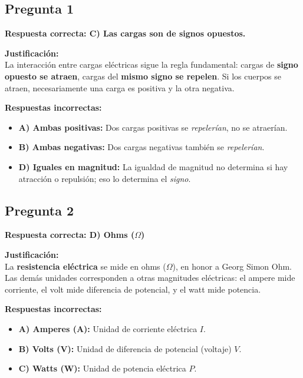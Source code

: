 \begin{respuestabox}
\subsection*{Pregunta 1}
\textcolor{verdecorrecto}{\textbf{Respuesta correcta: C) Las cargas son de signos opuestos.}}

\textbf{Justificación:}\\
La interacción entre cargas eléctricas sigue la regla fundamental: cargas de \textbf{signo opuesto se atraen}, cargas del \textbf{mismo signo se repelen}. Si los cuerpos se atraen, necesariamente una carga es positiva y la otra negativa.

\textbf{Respuestas incorrectas:}
\begin{itemize}
    \item \textbf{A) Ambas positivas:} Dos cargas positivas se \textit{repelerían}, no se atraerían.
    \item \textbf{B) Ambas negativas:} Dos cargas negativas también se \textit{repelerían}.
    \item \textbf{D) Iguales en magnitud:} La igualdad de magnitud no determina si hay atracción o repulsión; eso lo determina el \textit{signo}.
\end{itemize}
\end{respuestabox}

\begin{respuestabox}
\subsection*{Pregunta 2}
\textcolor{verdecorrecto}{\textbf{Respuesta correcta: D) Ohms ($\Omega$)}}

\textbf{Justificación:}\\
La \textbf{resistencia eléctrica} se mide en ohms ($\Omega$), en honor a Georg Simon Ohm. Las demás unidades corresponden a otras magnitudes eléctricas: el ampere mide corriente, el volt mide diferencia de potencial, y el watt mide potencia.

\textbf{Respuestas incorrectas:}
\begin{itemize}
    \item \textbf{A) Amperes (A):} Unidad de corriente eléctrica $I$.
    \item \textbf{B) Volts (V):} Unidad de diferencia de potencial (voltaje) $V$.
    \item \textbf{C) Watts (W):} Unidad de potencia eléctrica $P$.
\end{itemize}
\end{respuestabox}

